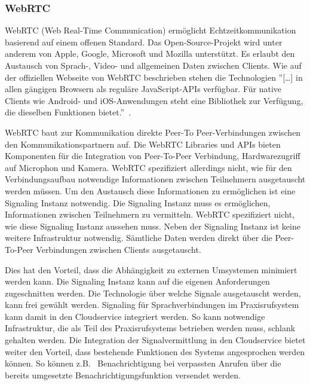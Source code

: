 \subsubsection{WebRTC}

WebRTC (Web Real-Time Communication) ermöglicht Echtzeitkommunikation basierend auf einem offenen Standard.
Das Open-Source-Projekt wird unter anderem von Apple, Google, Microsoft und Mozilla unterstützt.
Es erlaubt den Austausch von Sprach-, Video- und allgemeinen Daten zwischen Clients.
Wie auf der offiziellen Webseite von WebRTC beschrieben stehen die Technologien
''[\ldots] in allen gängigen Browsern als reguläre JavaScript-APIs verfügbar.
Für native Clients wie Android- und iOS-Anwendungen steht eine Bibliothek zur Verfügung, die dieselben Funktionen bietet.''~\cite{webrtc}.

WebRTC baut zur Kommunikation direkte Peer-To Peer-Verbindungen zwischen den Kommunikationspartnern auf.
Die WebRTC Libraries und APIs bieten Komponenten für die Integration von Peer-To-Peer Verbindung, Hardwarezugriff auf Microphon und Kamera.
WebRTC spezifiziert allerdings nicht, wie für den Verbindungsaufbau notwendige Informationen zwischen Teilnehmern ausgetauscht werden müssen.
Um den Austausch diese Informationen zu ermöglichen ist eine Signaling Instanz notwendig.
Die Signaling Instanz muss es ermöglichen, Informationen zwischen Teilnehmern zu vermitteln.
WebRTC spezifiziert nicht, wie diese Signaling Instanz aussehen muss.
Neben der Signaling Instanz ist keine weitere Infrastruktur notwendig.
Sämtliche Daten werden direkt über die Peer-To-Peer Verbindungen zwischen Clients ausgetauscht.

Dies hat den Vorteil, dass die Abhängigkeit zu externen Umsystemen minimiert werden kann.
Die Signaling Instanz kann auf die eigenen Anforderungen zugeschnitten werden.
Die Technologie über welche Signale ausgetauscht werden, kann frei gewählt werden.
Signaling für Sprachverbindungen im Praxisrufsystem kann damit in den Cloudservice integriert werden.
So kann notwendige Infrastruktur, die als Teil des Praxisrufsystems betrieben werden muss, schlank gehalten werden.
Die Integration der Signalvermittlung in den Cloudservice bietet weiter den Vorteil, dass bestehende Funktionen des Systems angesprochen werden können.
So können z.B. \ Benachrichtigung bei verpassten Anrufen über die bereits umgesetzte Benachrichtigungsfunktion versendet werden.

